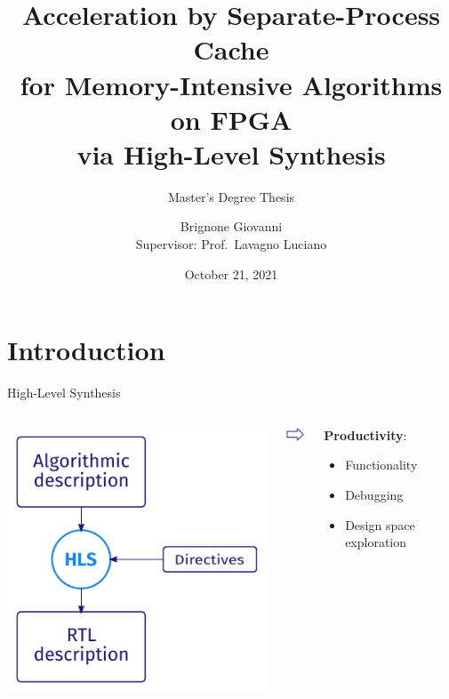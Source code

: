 \documentclass[aspectratio=169]{beamer}
\title{Acceleration by Separate-Process Cache\\for Memory-Intensive Algorithms
on FPGA\\via High-Level Synthesis}
\subtitle{Master's Degree Thesis}
\author{Brignone Giovanni \\ \tiny{Supervisor:} \small{Prof.\ Lavagno Luciano}}
\institute{Politecnico di Torino}
\date{October 21, 2021}
\begin{document}
\begin{frame}
	\maketitle
\end{frame}


{
	\section{Introduction}
}
\begin{frame}{High-Level Synthesis}
	\begin{columns}[c]
		\begin{column}{.45\textwidth}
			\begin{center}
				\includegraphics[height=.6\textheight]{hls}
			\end{center}
		\end{column}
		\begin{column}{.05\textwidth}
			\begin{center}
				\includegraphics[width=0.7cm]{arrow}
			\end{center}
		\end{column}
		\begin{column}{.45\textwidth}
			\textbf{Productivity}:
			\begin{itemize}
				\item Functionality
				\item Debugging
				\item Design space exploration
			\end{itemize}
		\end{column}
	\end{columns}
\end{frame}
\end{document}
